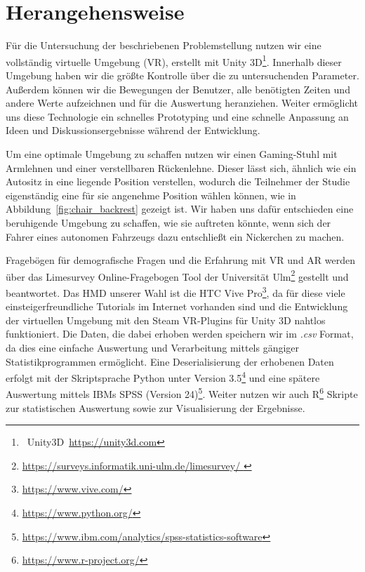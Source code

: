 \section{Herangehensweise}\label{sec:approach}  

Für die Untersuchung der beschriebenen Problemstellung nutzen wir eine vollständig virtuelle Umgebung (VR), erstellt mit Unity 3D\footnote{~Unity3D~\url{https://unity3d.com}}. Innerhalb dieser Umgebung haben wir die größte Kontrolle über die zu untersuchenden Parameter. Außerdem können wir die Bewegungen der Benutzer, alle benötigten Zeiten und andere Werte aufzeichnen und für die Auswertung heranziehen. Weiter ermöglicht uns diese Technologie ein schnelles Prototyping und eine schnelle Anpassung an Ideen und Diskussionsergebnisse während der Entwicklung.

Um eine optimale Umgebung zu schaffen nutzen wir einen Gaming-Stuhl mit Armlehnen und einer verstellbaren Rückenlehne. Dieser lässt sich, ähnlich wie ein Autositz in eine liegende Position verstellen, wodurch die Teilnehmer der Studie eigenständig eine für sie angenehme Position wählen können, wie in Abbildung~\ref{fig:chair_backrest} gezeigt ist. Wir haben uns dafür entschieden eine beruhigende Umgebung zu schaffen, wie sie auftreten könnte, wenn sich der Fahrer eines autonomen Fahrzeugs dazu entschließt ein Nickerchen zu machen.

Fragebögen für demografische Fragen und die Erfahrung mit VR und AR werden über das Limesurvey Online-Fragebogen Tool der Universität Ulm\footnote{\url{https://surveys.informatik.uni-ulm.de/limesurvey/
}} gestellt und beantwortet.
Das HMD unserer Wahl ist die HTC Vive Pro\footnote{\url{https://www.vive.com/}}, da für diese viele einsteigerfreundliche Tutorials im Internet vorhanden sind und die Entwicklung der virtuellen Umgebung mit den Steam VR-Plugins für Unity 3D nahtlos funktioniert. Die Daten, die dabei erhoben werden speichern wir im \textit{.csv} Format, da dies eine einfache Auswertung und Verarbeitung mittels gängiger Statistikprogrammen ermöglicht. Eine Deserialisierung der erhobenen Daten erfolgt mit der Skriptsprache Python unter Version 3.5\footnote{\url{https://www.python.org/}} und eine spätere Auswertung mittels IBMs SPSS (Version 24)\footnote{\url{https://www.ibm.com/analytics/spss-statistics-software}}. Weiter nutzen wir auch R\footnote{\url{https://www.r-project.org/}} Skripte zur statistischen Auswertung sowie zur Visualisierung der Ergebnisse.
